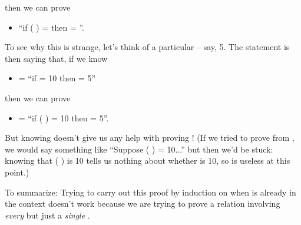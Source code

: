 \documentclass[12pt]{report}
\begin{document}
    then we can prove



\begin{itemize}
\item  ``if  ( ) =   then   = ''.

\end{itemize}


    To see why this is strange, let's think of a particular  --
    say, 5.  The statement is then saying that, if we know



\begin{itemize}
\item  {} = ``if   = 10 then  = 5''

\end{itemize}


    then we can prove



\begin{itemize}
\item  {} = ``if  ( ) = 10 then   = 5''.

\end{itemize}


    But knowing  doesn't give us any help with proving !  (If we
    tried to prove  from , we would say something like ``Suppose
     ( ) = 10...'' but then we'd be stuck: knowing that
     ( ) is 10 tells us nothing about whether  
    is 10, so  is useless at this point.) 

 To summarize: Trying to carry out this proof by induction on 
    when  is already in the context doesn't work because we are
    trying to prove a relation involving \textit{every}  but just a
    \textit{single} . 
\end{document}
